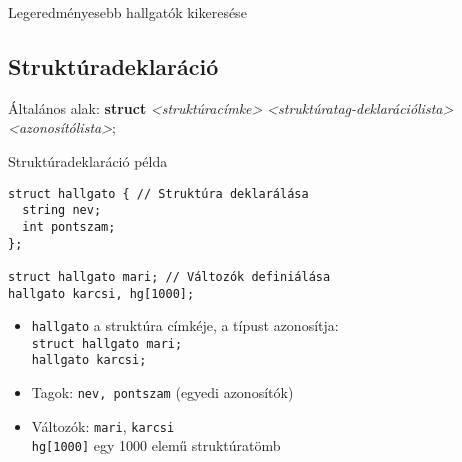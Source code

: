 \documentclass[usenames,dvipsnames,aspectratio=169]{beamer}
\begin{document}
\begin{frame}
  \begin{exampleblock}{ Legeredményesebb hallgatók kikeresése}
    \vspace{-.2cm}
    
    \vspace{-.2cm}
  \end{exampleblock}
\end{frame}


\begin{frame}
  \begin{exampleblock}{}
    
  \end{exampleblock}
\end{frame}

\subsection{Struktúradeklaráció}
\begin{frame}[fragile]
  \footnotesize
  Általános alak: \textbf{struct} \emph{{<}struktúracímke>} \emph{{<}{struktúratag-deklarációlista}> <azonosítólista>};
  \begin{exampleblock}{Struktúradeklaráció példa}
    \vspace{-.2cm}
    \begin{verbatim}
struct hallgato { // Struktúra deklarálása
  string nev;
  int pontszam;
};

struct hallgato mari; // Változók definiálása
hallgato karcsi, hg[1000];
\end{verbatim}
  \vspace{-.2cm}
  \end{exampleblock}
  \begin{itemize}
    \item \texttt{hallgato} a struktúra címkéje, a típust azonosítja:\\
      \texttt{struct hallgato mari;} \\
      \texttt{hallgato karcsi;}
    \item Tagok: \texttt{nev, pontszam} (egyedi azonosítók)
    \item Változók: \texttt{mari}, \texttt{karcsi}\\ 
      \texttt{hg[1000]} egy 1000 elemű struktúratömb
  \end{itemize}
\end{frame}
\end{document}

